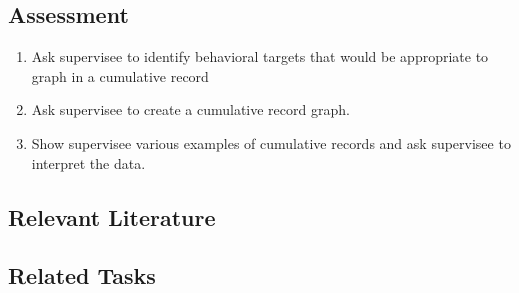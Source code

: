 \subsection{Assessment}
\begin{enumerate}
\item Ask supervisee to identify behavioral targets that would be appropriate to graph in a cumulative record
\item Ask supervisee to create a cumulative record graph.
\item Show supervisee various examples of cumulative records and ask supervisee to interpret the data.
\end{enumerate}
%
\subsection{Relevant Literature}
\begin{refsection}
\nocite{cooper2007applied,ferster1957schedules}
\printbibliography[heading=none]
\end{refsection}
% 
\subsection{Related Tasks}
\fouraTen{}\\
\fourhOne{}\\
\fourhTwo{}\\
\fourhThree{}\\
\fourhFour{}\\
\fourhFive{}\\

